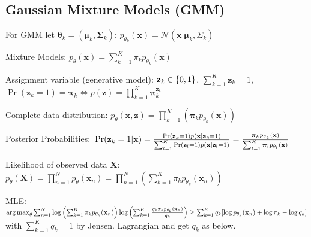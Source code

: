 \documentclass[a4paper, 11pt, landscape]{article}
\DeclareMathOperator*{\argmax}{arg\,max}
\begin{document}
\begin{multicols*}{3}
\section{Gaussian Mixture Models (GMM)}
For GMM let $\boldsymbol{\theta}_k = (\boldsymbol{\mu}_k, \boldsymbol{\Sigma}_k)$; $p_{\theta_k}(\mathbf{x}) = \mathcal{N}(\mathbf{x} | \boldsymbol{\mu}_k, \Sigma_k)$
\begin{compactdesc}
	\item[Mixture Models:] $p_\theta(\mathbf{x}) = \sum_{k=1}^K \pi_k p_{\theta_k}(\mathbf{x})$
	\item[Assignment variable (generative model):] $\\\mathbf{z}_k \in \{0, 1\}$, $\sum_{k=1}^K \mathbf{z}_k = 1$, $\operatorname{Pr}(\mathbf{z}_k = 1) = \boldsymbol{\pi}_k \Leftrightarrow p(\mathbf{z}) = \prod_{k=1}^K \boldsymbol{\pi}_k^{\mathbf{z}_k}$
	\item[Complete data distribution:] $p_\theta(\mathbf{x}, \mathbf{z}) = \prod_{k=1}^K \left( \boldsymbol{\pi}_k p_{\theta_k}(\mathbf{x})\right)$
	\item[Posterior Probabilities:] $\\\operatorname{Pr}(\mathbf{z}_k = 1 | \mathbf{x}) = \frac{\operatorname{Pr}(\mathbf{z}_k = 1) p(\mathbf{x} | \mathbf{z}_k = 1)}{\sum_{l=1}^K \operatorname{Pr}(\mathbf{z}_l = 1) p(\mathbf{x} | \mathbf{z}_l = 1)} = \frac{\boldsymbol{\pi}_k p_{\theta_k}(\mathbf{x})}{\sum_{l=1}^K \boldsymbol{\pi}_l p_{\theta_l}(\mathbf{x})}$
	\item[Likelihood of observed data $\mathbf{X}$:] $p_\theta(\mathbf{X}) = \prod_{n=1}^N p_\theta(\mathbf{x}_n) = \prod_{n=1}^N \left(\sum_{k=1}^K \pi_k p_{\theta_k}(\mathbf{x}_n)\right)$
	\item[MLE:] $\argmax_\theta\sum_{n=1}^N \log \left( \sum_{k=1}^K \pi_k p_{\theta_k}(\mathbf{x}_n)\right) \break \log \left( \sum_{k=1}^K{\frac{q_k \pi_k p_{\theta_k}(\mathbf{x}_n)}{q_k}}\right) \ge \sum_{k=1}^K{q_k[\log p_{\theta_k}(\mathbf{x}_n) + \log \pi_k - \log q_k]}$ with $\sum_{k=1}^K{q_k} = 1$ by Jensen. Lagrangian and get $q_k$ as below.
\end{compactdesc}


\end{multicols*}
\end{document}

